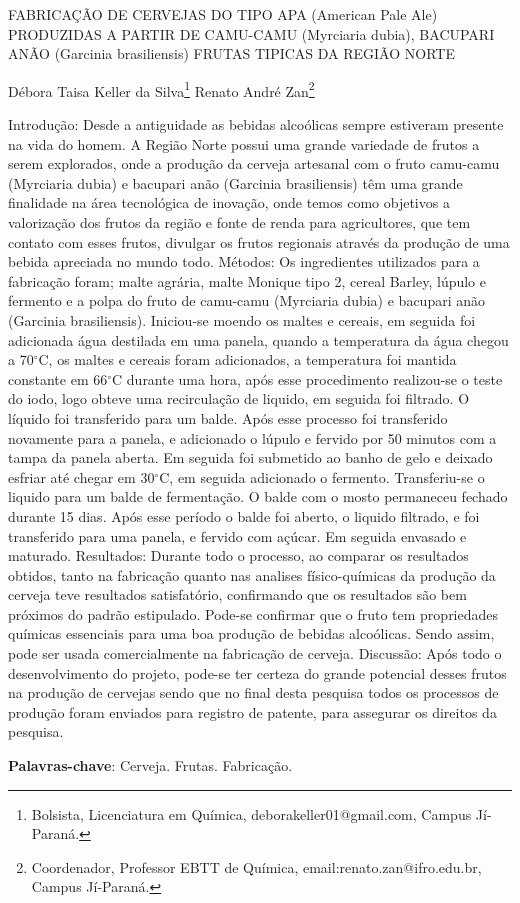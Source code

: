 \documentclass[article,12pt,onesidea,4paper,english,brazil]{abntex2}
\begin{document}
	
	
	\frenchspacing 
	
	\begin{center}
		\LARGE FABRICAÇÃO DE CERVEJAS DO TIPO APA (American Pale Ale) PRODUZIDAS
		A PARTIR DE CAMU-CAMU (Myrciaria dubia), BACUPARI ANÃO (Garcinia
		brasiliensis) FRUTAS TIPICAS DA REGIÃO NORTE
		
		\normalsize
		Débora Taisa Keller da Silva\footnote{Bolsista, Licenciatura em Química, deborakeller01@gmail.com, Campus Jí-Paraná.} 
		Renato André Zan\footnote{Coordenador, Professor EBTT de Química, email:renato.zan@ifro.edu.br, Campus Jí-Paraná.}
	\end{center}
	
	\noindent Introdução: Desde a antiguidade as bebidas alcoólicas sempre estiveram presente
	na vida do homem. A Região Norte possui uma grande variedade de frutos a serem
	explorados, onde a produção da cerveja artesanal com o fruto camu-camu (Myrciaria
	dubia) e bacupari anão (Garcinia brasiliensis) têm uma grande finalidade na área
	tecnológica de inovação, onde temos como objetivos a valorização dos frutos da
	região e fonte de renda para agricultores, que tem contato com esses frutos, divulgar
	os frutos regionais através da produção de uma bebida apreciada no mundo todo.
	Métodos: Os ingredientes utilizados para a fabricação foram; malte agrária, malte
	Monique tipo 2, cereal Barley, lúpulo e fermento e a polpa do fruto de camu-camu
	(Myrciaria dubia) e bacupari anão (Garcinia brasiliensis). Iniciou-se moendo os
	maltes e cereais, em seguida foi adicionada água destilada em uma panela, quando
	a temperatura da água chegou a 70$^\circ$C, os maltes e cereais foram adicionados, a
	temperatura foi mantida constante em 66$^\circ$C durante uma hora, após esse
	procedimento realizou-se o teste do iodo, logo obteve uma recirculação de liquido,
	em seguida foi filtrado. O líquido foi transferido para um balde. Após esse processo
	foi transferido novamente para a panela, e adicionado o lúpulo e fervido por 50
	minutos com a tampa da panela aberta. Em seguida foi submetido ao banho de gelo
	e deixado esfriar até chegar em 30$^\circ$C, em seguida adicionado o fermento.
	Transferiu-se o liquido para um balde de fermentação. O balde com o mosto
	permaneceu fechado durante 15 dias. Após esse período o balde foi aberto, o liquido
	filtrado, e foi transferido para uma panela, e fervido com açúcar. Em seguida
	envasado e maturado. Resultados: Durante todo o processo, ao comparar os
	resultados obtidos, tanto na fabricação quanto nas analises físico-químicas da
	produção da cerveja teve resultados satisfatório, confirmando que os resultados são
	bem próximos do padrão estipulado. Pode-se confirmar que o fruto tem propriedades
	químicas essenciais para uma boa produção de bebidas alcoólicas. Sendo assim,
	pode ser usada comercialmente na fabricação de cerveja. Discussão: Após todo o
	desenvolvimento do projeto, pode-se ter certeza do grande potencial desses frutos
	na produção de cervejas sendo que no final desta pesquisa todos os processos de
	produção foram enviados para registro de patente, para assegurar os direitos da
	pesquisa.
	
	\vspace{\onelineskip}
	
	\noindent
	\textbf{Palavras-chave}: Cerveja. Frutas. Fabricação.
	
\end{document}
